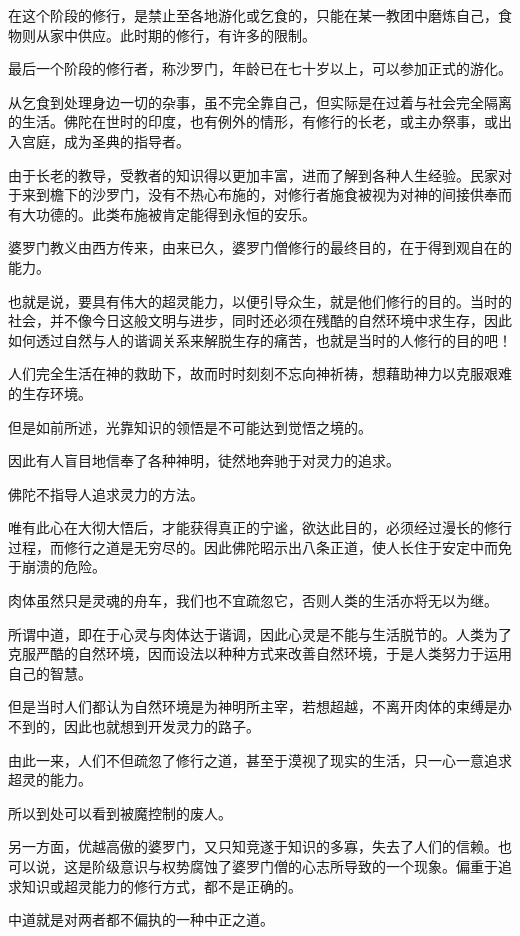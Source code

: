 \documentclass[twoside,openany]{book}
\begin{document}
在这个阶段的修行，是禁止至各地游化或乞食的，只能在某一教团中磨炼自己，食物则从家中供应。此时期的修行，有许多的限制。

最后一个阶段的修行者，称沙罗门，年龄已在七十岁以上，可以参加正式的游化。

从乞食到处理身边一切的杂事，虽不完全靠自己，但实际是在过着与社会完全隔离的生活。佛陀在世时的印度，也有例外的情形，有修行的长老，或主办祭事，或出入宫庭，成为圣典的指导者。

由于长老的教导，受教者的知识得以更加丰富，进而了解到各种人生经验。民家对于来到檐下的沙罗门，没有不热心布施的，对修行者施食被视为对神的间接供奉而有大功德的。此类布施被肯定能得到永恒的安乐。

婆罗门教义由西方传来，由来已久，婆罗门僧修行的最终目的，在于得到观自在的能力。

也就是说，要具有伟大的超灵能力，以便引导众生，就是他们修行的目的。当时的社会，并不像今日这般文明与进步，同时还必须在残酷的自然环境中求生存，因此如何透过自然与人的谐调关系来解脱生存的痛苦，也就是当时的人修行的目的吧！

人们完全生活在神的救助下，故而时时刻刻不忘向神祈祷，想藉助神力以克服艰难的生存环境。

但是如前所述，光靠知识的领悟是不可能达到觉悟之境的。

因此有人盲目地信奉了各种神明，徒然地奔驰于对灵力的追求。

佛陀不指导人追求灵力的方法。

唯有此心在大彻大悟后，才能获得真正的宁谧，欲达此目的，必须经过漫长的修行过程，而修行之道是无穷尽的。因此佛陀昭示出八条正道，使人长住于安定中而免于崩溃的危险。

肉体虽然只是灵魂的舟车，我们也不宜疏忽它，否则人类的生活亦将无以为继。

所谓中道，即在于心灵与肉体达于谐调，因此心灵是不能与生活脱节的。人类为了克服严酷的自然环境，因而设法以种种方式来改善自然环境，于是人类努力于运用自己的智慧。

但是当时人们都认为自然环境是为神明所主宰，若想超越，不离开肉体的束缚是办不到的，因此也就想到开发灵力的路子。

由此一来，人们不但疏忽了修行之道，甚至于漠视了现实的生活，只一心一意追求超灵的能力。

所以到处可以看到被魔控制的废人。

另一方面，优越高傲的婆罗门，又只知竞遂于知识的多寡，失去了人们的信赖。也可以说，这是阶级意识与权势腐蚀了婆罗门僧的心志所导致的一个现象。偏重于追求知识或超灵能力的修行方式，都不是正确的。

中道就是对两者都不偏执的一种中正之道。
\end{document}
